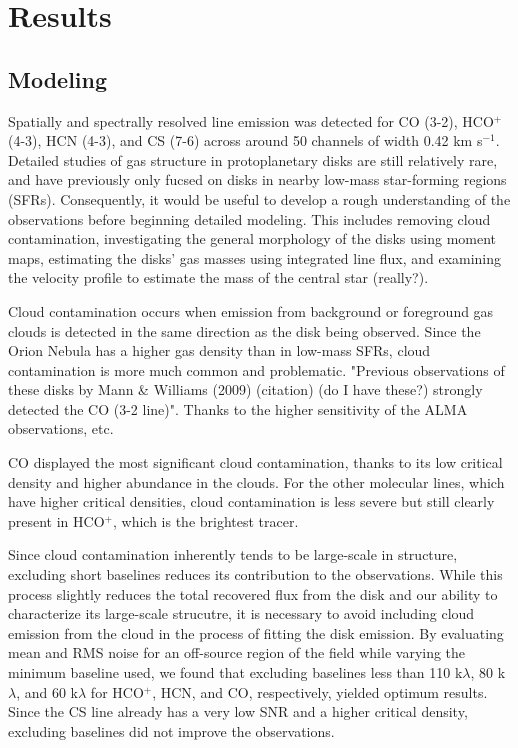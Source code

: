 \chapter{Results}
\label{chap:results}

\section{Modeling}


Spatially and spectrally resolved line emission was detected for CO (3-2), HCO$^{+}$ (4-3), HCN (4-3), and CS (7-6) across around 50 channels of width 0.42 km s$^{-1}$. Detailed studies of gas structure in protoplanetary disks are still relatively rare, and have previously only fucsed on disks in nearby low-mass star-forming regions (SFRs). Consequently, it would be useful to develop a rough understanding of the observations before beginning detailed modeling. This includes removing cloud contamination, investigating the general morphology of the disks using moment maps, estimating the disks' gas masses using integrated line flux, and examining the velocity profile to estimate the mass of the central star (really?).

Cloud contamination occurs when emission from background or foreground gas clouds is detected in the same direction as the disk being observed. Since the Orion Nebula has a higher gas density than in low-mass SFRs, cloud contamination is more much common and problematic. "Previous observations of these disks by Mann & Williams (2009) (citation) (do I have these?) strongly detected the CO (3-2 line)". Thanks to the higher sensitivity of the ALMA observations, etc.

CO displayed the most significant cloud contamination, thanks to its low critical density and higher abundance in the clouds. For the other molecular lines, which have higher critical densities, cloud contamination is less severe but still clearly present in HCO$^{+}$, which is the brightest tracer.

Since cloud contamination inherently tends to be large-scale in structure, excluding short baselines reduces its contribution to the observations. While this process slightly reduces the total recovered flux from the disk and our ability to characterize its large-scale strucutre, it is necessary to avoid including cloud emission from the cloud in the process of fitting the disk emission. By evaluating mean and RMS noise for an off-source region of the field while varying the minimum baseline used, we found that excluding baselines less than 110 k$\lambda$, 80 k$\lambda$, and 60  k$\lambda$ for HCO$^{+}$, HCN, and CO, respectively, yielded optimum results. Since the CS line already has a very low SNR and a higher critical density, excluding baselines did not improve the observations.





